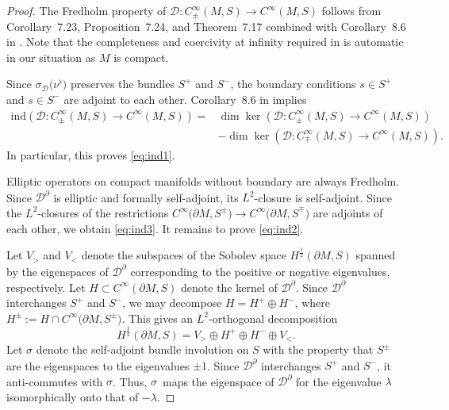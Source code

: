 \begin{proof}
The Fredholm property of $\mathcal{D}\colon C^\infty_\pm(M,S)\to C^\infty(M,S)$ follows from Corollary~7.23, Proposition~7.24, and Theorem~7.17 combined with Corollary~8.6 in \cite{Baer-Ballmann}.
Note that the completeness and coercivity at infinity required in \cite{Baer-Ballmann} is automatic in our situation as $M$ is compact.

Since $\sigma_{\mathcal{D}}\big(\nu^\flat\big)$ preserves the bundles $S^+$ and $S^-$, the boundary conditions $s\in S^+$ and $s\in S^-$ are adjoint to each other.
Corollary~8.6 in \cite{Baer-Ballmann} implies
\begin{align*}
\mathrm{ind}(\mathcal{D}\colon C^\infty_\pm(M,S)\to C^\infty(M,S))
={}&
\dim\ker(\mathcal{D}\colon C^\infty_\pm(M,S)\to C^\infty(M,S)) \\
& -
\dim\ker(\mathcal{D}\colon C^\infty_\mp(M,S)\to C^\infty(M,S)).
\end{align*}
In particular, this proves \eqref{eq:ind1}.

Elliptic operators on compact manifolds without boundary are always Fredholm.
Since $\mathcal{D}^\partial$ is elliptic and formally self-adjoint, its $L^2$-closure is self-adjoint.
Since the $L^2$-closures of the restrictions $C^\infty\big(\partial M,S^\pm\big)\to C^\infty\big(\partial M,S^\mp\big)$ are adjoints of each other, we obtain \eqref{eq:ind3}.
It remains to prove \eqref{eq:ind2}.

Let $V_>$ and $V_<$ denote the subspaces of the Sobolev space $H^{\frac{1}{2}}(\partial M,S)$ spanned by the eigenspaces of $\mathcal{D}^\partial$ corresponding to the positive or negative eigenvalues, respectively.
Let $H\subset C^\infty(\partial M,S)$ denote the kernel of $\mathcal{D}^\partial$.
Since $\mathcal{D}^\partial$ interchanges $S^+$ and $S^-$, we may decompose $H=H^+\oplus H^-$, where $H^\pm := H\cap C^\infty\big(\partial M,S^\pm\big)$.
This gives an $L^2$-orthogonal decomposition
\[
H^{\frac{1}{2}}(\partial M,S) = V_> \oplus H^+ \oplus H^- \oplus V_< .
\]
Let $\sigma$ denote the self-adjoint bundle involution on $S$ with the property that $S^\pm$ are the eigen\-spaces to the eigenvalues $\pm 1$.
Since $\mathcal{D}^\partial$ interchanges $S^+$ and $S^-$, it anti-commutes with $\sigma$.
Thus, $\sigma$~maps the eigenspace of $\mathcal{D}^\partial$ for the eigenvalue $\lambda$ isomorphically onto that of $-\lambda$.


\end{proof}
